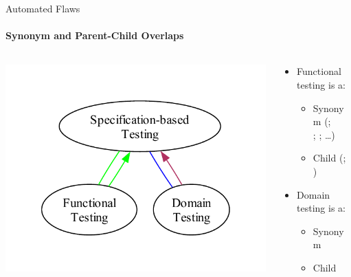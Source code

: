 \begin{frame}{Automated Flaws}
    \framesubtitle{Synonym and Parent-Child Overlaps}
    \begin{columns}[c]
        \begin{column}{.4\linewidth}
            \includegraphics[width=\linewidth]{assets/graphs/manual/expParSynSpecGraph.pdf}
        \end{column}
        \begin{column}{.65\linewidth}
            \begin{itemize}
                \item Functional testing is a:
                      \begin{itemize}
                          \item Synonym {\tiny (\citealp[p.~196]{IEEE2017}; \\\hspace{0.5cm} \citealp[p.~399]{vanVliet2000}; \citealp[pp.~44\==45, 48]{Kam2008}; \dots{})}
                          \item Child {\tiny (\citealp[p.~38]{IEEE2021c}; \citealp[p.~42]{Kam2008})}
                      \end{itemize}
                \item Domain testing is a:
                      \begin{itemize}
                          \item Synonym {\tiny \citep[p.~5\=/10]{SWEBOK2024}}
                          \item Child {\tiny \citep[Tab.~12.1]{PetersAndPedrycz2000}}
                      \end{itemize}
            \end{itemize}
        \end{column}
    \end{columns}
\end{frame}

